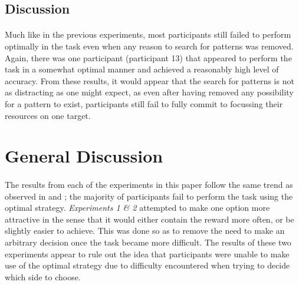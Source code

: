\documentclass[12pt]{article}
\begin{document}
\subsection*{Discussion}
\paragraph{} Much like in the previous experiments, most participants still failed to perform optimally in the task even when any reason to search for patterns was removed. Again, there was one participant (participant 13) that appeared to perform the task in a somewhat optimal manner and achieved a reasonably high level of accuracy. From these results, it would appear that the search for patterns is not as distracting as one might expect, as even after having removed any possibility for a pattern to exist, participants still fail to fully commit to focussing their resources on one target.


\section*{General Discussion}
\paragraph{} The results from each of the experiments in this paper follow the same trend as observed in \cite{clarke2015failure} and \cite{James2017}; the majority of participants fail to perform the task using the optimal strategy. \textit{Experiments 1 \& 2} attempted to make one option more attractive in the sense that it would either contain the reward more often, or be slightly easier to achieve. This was done so as to remove the need to make an arbitrary decision once the task became more difficult. The results of these two experiments appear to rule out the idea that participants were unable to make use of the optimal strategy due to difficulty encountered when trying to decide which side to choose. 
\end{document}
